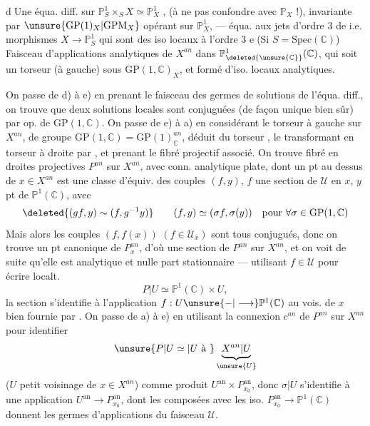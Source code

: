 \textcircled{d}\quad Une équa. diff.  sur $\mathbb P^1_S\times_S X\simeq\mathbb P^1_X$ , (à ne pas confondre avec $\mathbb P_X$ !), invariante par $\unsure{\mathrm{GP}(1)_X|\mathrm{GPM}_X}$ opérant sur $\mathbb P^1_X$, --- équa.  aux jets d'ordre 3 de  i.e. morphismes $X\longrightarrow\mathbb P^1_S$ qui sont des iso locaux à l'ordre 3
\textcircled{e}\quad (Si $S=\mathrm{Spec}(\mathbb C)$)  Faisceau  d'applications analytiques de $X^{an}$ dans $\mathbb P^1_{\deleted{\unsure{\mathbb C}}}(\mathbb C)$, qui soit un torseur (à gauche) sous  $\mathrm{GP}(1,\mathbb C)_X$, et formé d'iso. locaux analytiques.

On passe de d) à e) en prenant le faisceau des germes de solutions de l'équa. diff., on trouve que deux solutions locales sont conjuguées (de façon unique bien sûr) par op. de $\mathrm{GP}(1,\mathbb C)$.
On passe de e) à a) en considérant le torseur à gauche  sur $X^{an}$, de groupe $\mathrm{GP}(1,\mathbb C)=\mathrm{GP}(1)_{\mathbb C}^{an}$, déduit du torseur , le transformant en torseur à droite par , et prenant le fibré projectif associé.
On trouve fibré en droites projectives $P^{an}$ sur $X^{an}$, avec conn. analytique plate, dont un pt au dessus de $x\in X^{an}$ est une classe d'équiv. des couples $(f,y)$, $f$ une  section de $\mathcal U$ en $x$, $y$ pt de $\mathbb P^1(\mathbb C)$, avec
\[
\deleted{(gf,y)\sim(f,g^{-1}y)}\qquad(f,y)\simeq(\sigma f,\sigma(y))\quad\text{pour }\forall\sigma\in\mathrm{GP}(1,\mathbb C)
\]
Mais alors les couples $(f,f(x))$ $(f\in\mathcal U_x)$ sont tous conjugués, donc on trouve un pt canonique de $P^{an}_x$, d'où une section de $P^{an}$ sur $X^{an}$, et on voit de suite qu'elle est analytique et nulle part stationnaire --- utilisant $f\in\mathcal U$ pour écrire localt.
\[
P|U\simeq\mathbb P^1(\mathbb C)\times U,
\]
la section \inserted{$\sigma$} s'identifie à l'application $f:U\unsure{-|\longrightarrow}\mathbb P^1(\mathbb C)$ au vois. de $x$ bien fournie par .
On passe de a) à e) en utilisant la connexion $c^{an}$ de $P^{an}$ sur $X^{an}$ pour identifier
\[
\unsure{P|U\simeq|U\text{ à }}\underbrace{X^{an}|U}_{\unsure{U}}
\]
($U$ petit voisinage de $x\in X^{an}$)
comme produit $U^{\mathrm{an}}\times P_{x_0}^{\mathrm{an}}$, donc $\sigma|U$ s'identifie à une application $U^{\mathrm{an}}\longrightarrow P_{x_0}^{\mathrm{an}}$, dont les composées avec les iso. $P_{x_0}^{\mathrm{an}}\longrightarrow\mathbb P^1(\mathbb C)$ donnent les germes d'applications  du faisceau $\mathcal U$.

